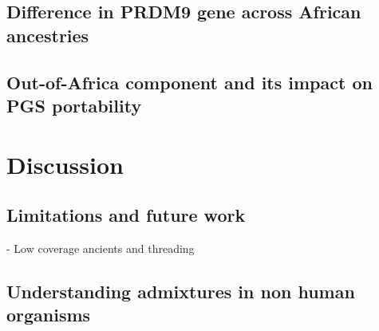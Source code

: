 
\subsection{Difference in PRDM9 gene across African ancestries}


\subsection{Out-of-Africa component and its impact on PGS portability}


\section{Discussion}
\subsection{Limitations and future work}
- Low coverage ancients and threading
\subsection{Understanding admixtures in non human organisms}